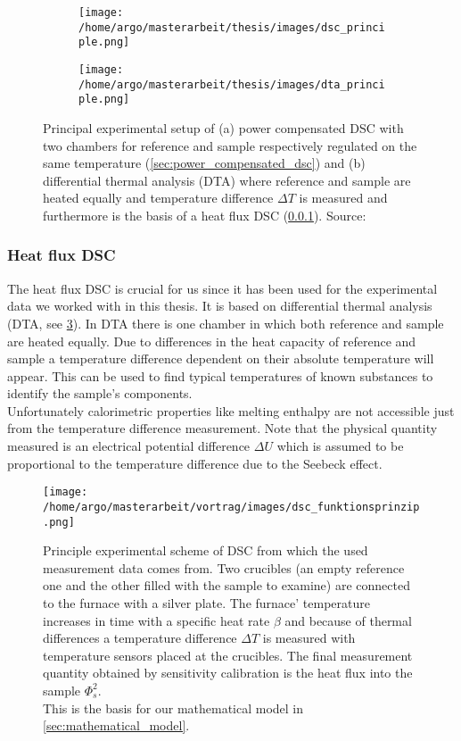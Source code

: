 \documentclass{scrartcl}[12pt, halfparskip]
\numberwithin{equation}{section}
\numberwithin{figure}{section}
\numberwithin{table}{section}
\begin{document}
\begin{figure}[H]
	\centering
	\begin{subfigure}{0.49\textwidth}
		\texttt{[image: /home/argo/masterarbeit/thesis/images/dsc\_principle.png]}
		\caption{}
		\label{fig:DSC_power_compensated_principle}
	\end{subfigure}
	\begin{subfigure}{0.49\textwidth}
		\texttt{[image: /home/argo/masterarbeit/thesis/images/dta\_principle.png]}
		\caption{}
		\label{fig:DTA_principle}
	\end{subfigure}
	\caption{Principal experimental setup of (a) power compensated DSC with two chambers for reference and sample respectively regulated on the same temperature (\cref{sec:power_compensated_dsc}) and (b) differential thermal analysis (DTA) where reference and sample are heated equally and temperature difference $\Delta T$ is measured and furthermore is the basis of a heat flux DSC (\cref{sec:heat_flux_dsc}). Source: \cite{DSC_buch}}
\end{figure}



\subsubsection{Heat flux DSC}
\label{sec:heat_flux_dsc}
The heat flux DSC is crucial for us since it has been used for the experimental data we worked with in this thesis. It is based on differential thermal analysis (DTA, see \cref{fig:DTA_principle}). 
In DTA there is one chamber in which both reference and sample are heated equally. 
Due to differences in the heat capacity of reference and sample a temperature difference dependent on their absolute temperature will appear.
This can be used to find typical temperatures of known substances to identify the sample's components. \\
Unfortunately calorimetric properties like melting enthalpy are not accessible just from the temperature difference measurement. 
Note that the physical quantity measured is an electrical potential difference $\Delta U$ which is assumed to be proportional to the temperature difference due to the Seebeck effect. \\

\begin{figure}[H]
	\centering
	\texttt{[image: /home/argo/masterarbeit/vortrag/images/dsc\_funktionsprinzip.png]}
	\caption{Principle experimental scheme of DSC from which the used measurement data comes from. Two crucibles (an empty reference one and the other filled with the sample to examine) are connected to the furnace with a silver plate. The furnace' temperature increases in time with a specific heat rate $\beta$ and because of thermal differences a temperature difference $\Delta T$ is measured with temperature sensors placed at the crucibles. The final measurement quantity obtained by sensitivity calibration is the heat flux into the sample $\varPhi_s^2$. \\
	This is the basis for our mathematical model in \cref{sec:mathematical_model}.}
	\label{fig:heat_flux_DSC}
\end{figure}
\end{document}
